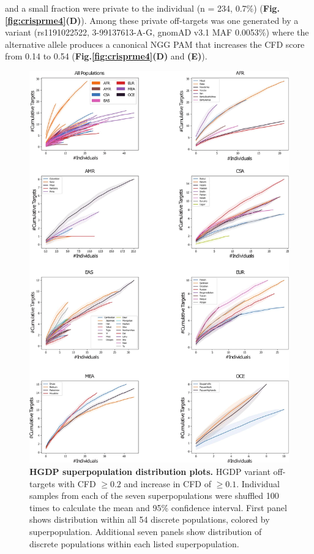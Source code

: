 \documentclass[a4paper, titlepage, openright]{book}
\begin{document}
and a small fraction were private to the individual (n = 234, 0.7\%) (\textbf{Fig.\ref{fig:crisprme4}(D)}).  Among these private off-targets was one generated by a variant (rs1191022522, 3-99137613-A-G, gnomAD v3.1 MAF 0.0053\%) where the alternative allele produces a canonical NGG PAM that increases the CFD score from 0.14 to 0.54 (\textbf{Fig.\ref{fig:crisprme4}(D)} and \textbf{(E)}).
\begin{figure}
	\centering
	\includegraphics[width=\textwidth]{figures/crisprme5.png}
	\caption[HGDP superpopulation distribution plots]{\textbf{HGDP superpopulation distribution plots.} HGDP variant off-targets with CFD $\geq 0.2$ and increase in CFD of $\geq 0.1$.  Individual samples from each of the seven superpopulations were shuffled 100 times to calculate the mean and 95\% confidence interval. First panel shows distribution within all 54 discrete populations, colored by superpopulation. Additional seven panels show distribution of discrete populations within each listed superpopulation.}
	\label{fig:crisprme5}
\end{figure}
\end{document}
